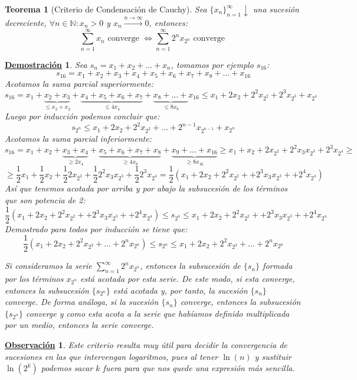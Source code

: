 \documentclass[10pt,a4paper,openright]{book}
\theoremstyle{break}
\newtheorem{theo}{Teorema}[chapter]
\newtheorem*{demo}{\underline{Demostración}}
\newtheorem{obs}{\underline{Observación}}[chapter]
\begin{document}
\begin{theo}[Criterio de Condensación de Cauchy]
Sea $\{x_n\}_{n=1}^\infty \downarrow$ una sucesión decreciente, $\forall n \in  \mathbb{N} : x_n > 0$ y $x_n \xrightarrow{n\rightarrow \infty} 0$, entonces:
$$\sum_{n=1}^{\infty} x_n \mbox{ converge } \Leftrightarrow \sum_{n=1}^{\infty} 2^n x_{2^n} \mbox{ converge }$$
\end{theo}
\begin{demo}
Sea $s_n = x_1 + x_2 + \ldots + x_n$, tomamos por ejemplo $s_{16}$:
$$s_{16} = x_1 + x_2 + x_3 + x_4 + x_5 + x_6 + x_7 + x_8 + \ldots + x_{16}$$
Acotamos la suma parcial superiormente:
$$s_{16} = x_1 + \underbrace{x_2 + x_3}_{ \leq x_2 + x_2} + \underbrace{x_4 + x_5 + x_6 + x_7}_{\leq 4x_4} + \underbrace{x_8 + \ldots +}_{\leq 8x_8} x_{16} \leq x_1 + 2x_2 + 2^2 x_{2^2} + 2^3 x_{2^3} + x_{2^4}$$
Luego por inducción podemos concluir que:
$$s_{2^n} \leq x_1 + 2x_2 + 2^2 x_{2^2} + \ldots + 2^{n-1} x_{2^{n-1}}+ x_{2^n}$$
Acotamos la suma parcial inferiormente:
$$s_{16} = x_1 + x_2 +\underbrace{ x_3 + x_4}_{\geq 2x_4} + \underbrace{ x_5 + x_6 + x_7 + x_8}_{\geq 4x_8} + \underbrace{ x_9 + \ldots + x_{16}}_{\geq 8x_{16}}\geq x_1 + x_2 + 2 x_{2^2} + 2^2 x_3 x_{2^3} +  2^3 x_{2^4} \geq$$
$$\geq \frac{1}{2}  x_1 + \frac{1}{2} x_2 + \frac{1}{2} 2 x_{2^2} + \frac{1}{2} 2^2 x_3 x_{2^3} + \frac{1}{2} 2^3 x_{2^4} =\frac{1}{2} (x_1 + 2x_2 + 2^2 x_{2^2} + + 2^3 x_3 x_{2^3} + + 2^4 x_{2^4})$$
Así que tenemos acotada por arriba y por abajo la subsucesión de los términos que son potencia de 2:
$$\frac{1}{2} (x_1 + 2x_2 + 2^2 x_{2^2} + + 2^3 x_3 x_{2^3} + + 2^4 x_{2^4}) \leq s_{2^4} \leq x_1 + 2x_2 + 2^2 x_{2^2} + + 2^3 x_3 x_{2^3} + + 2^4 x_{2^4}$$
Demostrado para todos por inducción se tiene que:
$$\frac{1}{2} (x_1 + 2x_2 + 2^2 x_{2^2} + \ldots + 2^n x_{2^n}) \leq s_{2^n} \leq x_1 + 2x_2 + 2^2 x_{2^2} + \ldots + 2^n x_{2^n}$$

Si consideramos la serie $ \sum_{n=1}^{\infty} 2^n x_{2^n} $, entonces la subsucesión de $\{s_n\}$ formada por los términos $x_{2^n}$ está acotada por 
esta serie. De este modo, si esta converge, entonces la subsucesión $\{s_{2^n}\}$ está acotada y, por tanto, la sucesión $\{s_n\}$ converge. De forma análoga, si la sucesión $\{s_n\}$ converge, entonces la subsucesión $\{s_{2^n}\}$ converge y como esta acota a la serie que habíamos definido multiplicada por un medio, entonces la serie converge.
\end{demo}

\begin{obs}
Este criterio resulta muy útil para decidir la convergencia de sucesiones en las que intervengan logaritmos, pues al tener $\ln (n)$ y sustituir $\ln (2^k)$ podemos sacar $k$ fuera para que nos quede una expresión más sencilla.
\end{obs}
\end{document}
